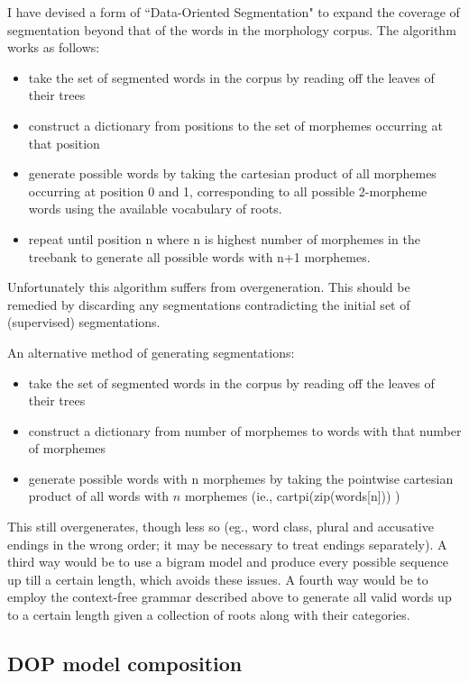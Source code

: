 \documentclass[10pt,a4paper]{article}
\begin{document}
I have devised a form of ``Data-Oriented Segmentation" to expand the
coverage of segmentation beyond that of the words in the morphology corpus. The
algorithm works as follows:

\begin{itemize}
\item take the set of segmented words in the corpus by reading off the leaves of their trees
\item construct a dictionary from positions to the set of morphemes occurring at that position
\item generate possible words by taking the cartesian product of all morphemes occurring
 at position 0 and 1, corresponding to all possible 2-morpheme words using the available
 vocabulary of roots.
\item repeat until position n where n is highest number of morphemes in the treebank to
 generate all possible words with n+1 morphemes.
\end{itemize}

Unfortunately this algorithm suffers from overgeneration. This should be
remedied by discarding any segmentations contradicting the initial set of
(supervised) segmentations. 

An alternative method of generating segmentations:

\begin{itemize}
\item take the set of segmented words in the corpus by reading off the leaves of their trees
\item construct a dictionary from number of morphemes to words with that number of morphemes
\item generate possible words with n morphemes by taking the pointwise cartesian product of
 all words with $n$ morphemes (ie., cartpi(zip(words[n])) )
\end{itemize}

This still overgenerates, though less so (eg., word class, plural and
accusative endings in the wrong order; it may be necessary to treat endings
separately). A third way would be to use a bigram model and produce every
possible sequence up till a certain length, which avoids these issues. A fourth
way would be to employ the context-free grammar described above to generate all
valid words up to a certain length given a collection of roots along with their
categories.

\subsection{DOP model composition}
\end{document}
